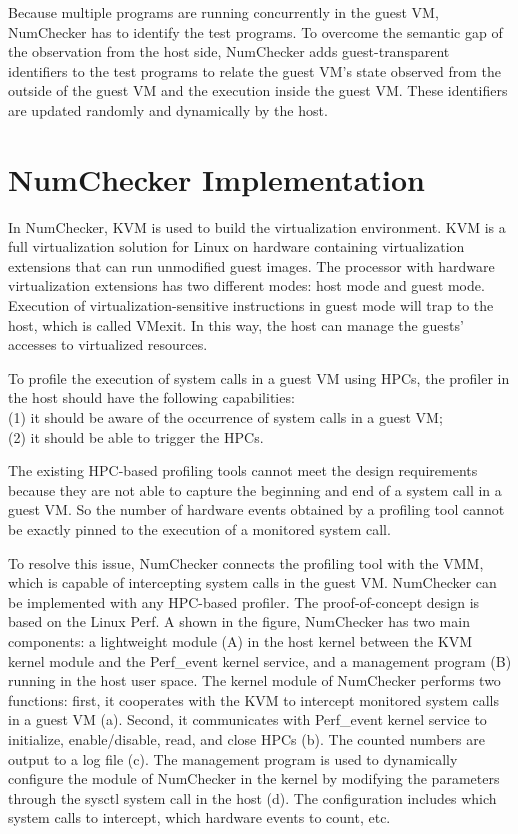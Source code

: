 \documentclass[12pt]{report}
\begin{document}
Because multiple programs are running concurrently in the
guest VM, NumChecker has to identify the test programs. To
overcome the semantic gap of the observation from the host
side, NumChecker adds guest-transparent identifiers to the test
programs to relate the guest VM’s state observed from the
outside of the guest VM and the execution inside the guest
VM. These identifiers are updated randomly and dynamically
by the host.

\chapter {NumChecker Implementation}
In NumChecker,  KVM is used to build the virtualization
environment. KVM is a full virtualization solution for Linux
on hardware containing virtualization extensions that can run
unmodified guest images. The processor with hardware virtualization
extensions has two different modes: host mode and
guest mode. Execution of virtualization-sensitive instructions
in guest mode will trap to the host, which is called VMexit.
In this way, the host can manage the guests’ accesses
to virtualized resources.

To profile the execution of system calls in a guest VM
using HPCs, the profiler in the host should have the following
capabilities: \\(1) it should be aware of the occurrence of system
calls in a guest VM; \\(2) it should be able to trigger the
HPCs. 

The existing HPC-based profiling tools cannot meet
the design requirements because they are not able to capture
the beginning and end of a system call in a guest VM. So the
number of hardware events obtained by a profiling tool cannot
be exactly pinned to the execution of a monitored system call.

To resolve this issue, NumChecker connects the profiling
tool with the VMM, which is capable of intercepting system
calls in the guest VM. NumChecker can be implemented with
any HPC-based profiler. The proof-of-concept design is based
on the Linux Perf. A shown in the figure, NumChecker has
two main components: a lightweight module (A) in the host
kernel between the KVM kernel module and the Perf\_event
kernel service, and a management program (B) running in
the host user space. The kernel module of NumChecker
performs two functions: first, it cooperates with the KVM to
intercept monitored system calls in a guest VM (a). Second,
it communicates with Perf\_event kernel service to initialize,
enable/disable, read, and close HPCs (b). The counted numbers
are output to a log file (c). The management program is used
to dynamically configure the module of NumChecker in the
kernel by modifying the parameters through the sysctl system
call in the host (d). The configuration includes which system
calls to intercept, which hardware events to count, etc.
\end{document}
